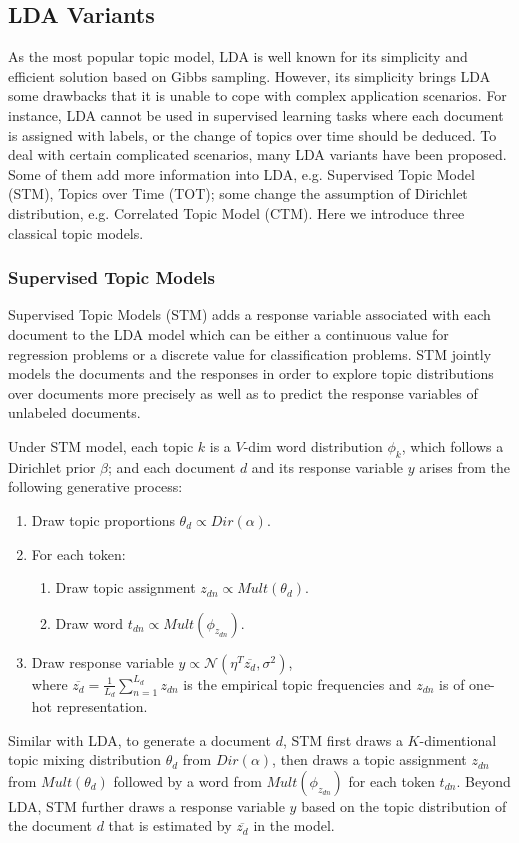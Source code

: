 \documentclass[10pt,journal,cspaper,compsoc]{IEEEtran}
\begin{document}
	
\subsection{LDA Variants}
As the most popular topic model,
LDA is well known for its simplicity and efficient solution based on Gibbs sampling. 
However, its simplicity brings LDA some drawbacks that it is unable to cope with complex application scenarios. 
For instance, LDA cannot be used in supervised learning tasks where each document is assigned with labels, or the change of topics over time should be deduced.
To deal with certain complicated scenarios, many LDA variants have been proposed. 
Some of them add more information into LDA, e.g. Supervised Topic Model (STM), Topics over Time (TOT); some change the assumption of Dirichlet distribution, e.g. Correlated Topic Model (CTM). Here we introduce three classical topic models.

\subsubsection{Supervised Topic Models}
Supervised Topic Models (STM) adds a response variable associated with each document to the LDA model which can be either a continuous value for regression problems or a discrete value for classification problems.
STM jointly models the documents and the responses in order to explore topic distributions over documents more precisely as well as to predict the response variables of unlabeled documents.

Under STM model, each topic $k$ is a $V$-dim word distribution $\phi_k$, which follows a Dirichlet prior $\beta$; and each document $d$ and its response variable $y$ arises from the following generative process:
\begin{enumerate}
	\item Draw topic proportions $\theta_d \propto Dir(\alpha)$.
	\item For each token:
	\begin{enumerate}
		\item Draw topic assignment $z_{dn} \propto Mult(\theta_d)$.
		\item Draw word $t_{dn} \propto Mult(\phi_{z_{dn}})$.
	\end{enumerate}
	\item Draw response variable $y \propto \mathcal{N}(\eta^T \overline{z_d}, \sigma^2)$,\\
	where $\overline{z_d} = \frac{1}{L_d} \sum_{n=1}^{L_d} z_{dn}$ is the empirical topic frequencies and $z_{dn}$ is of one-hot representation.
\end{enumerate}
Similar with LDA, to generate a document $d$, STM first draws a $K$-dimentional topic mixing distribution $\theta_d$ from $Dir(\alpha)$, then draws
a topic assignment $z_{dn}$ from $Mult(\theta_d)$ followed by a word from $Mult(\phi_{z_{dn}})$ for each token $t_{dn}$. Beyond LDA, STM further draws a response variable $y$
based on the topic distribution of the document $d$ that is estimated by $\overline{z_d}$ in the model.
\end{document}
